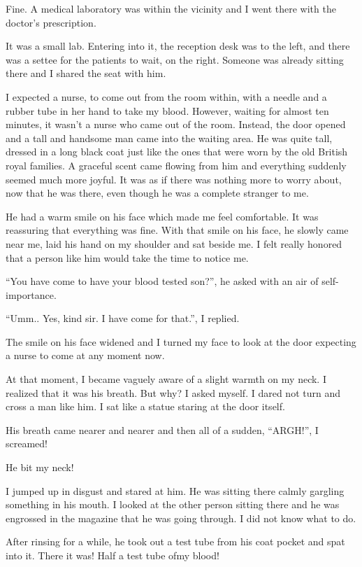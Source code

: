 \documentclass[twoside,11pt]{article}
\begin{document}
Fine. A medical laboratory was within the vicinity and I went there with the doctor's prescription.

It was a small lab. Entering into it, the reception desk was to the left, and there was a settee for the patients to wait, on the right. Someone was already sitting there and I shared the seat with him.

I expected a nurse, to come out from the room within, with a needle and a rubber tube in her hand to take my blood. However, waiting for almost ten minutes, it wasn't a nurse who came out of the room. Instead, the door opened and a tall and handsome man came into the waiting area. He was quite tall, dressed in a long black coat just like the ones that were worn by the old British royal families. A graceful scent came flowing from him and everything suddenly seemed much more joyful. It was as if there was nothing more to worry about, now that he was there, even though he was a complete stranger to me.

He had a warm smile on his face which made me feel comfortable. It was reassuring that everything was fine. With that smile on his face, he slowly came near me, laid his hand on my shoulder and sat beside me. I felt really honored that a person like him would take the time to notice me.

``You have come to have your blood tested son?'', he asked with an air of self-importance.

``Umm.. Yes, kind sir. I have come for that.'', I replied.

The smile on his face widened and I turned my face to look at the door expecting a nurse to come at any moment now.

At that moment, I became vaguely aware of a slight warmth on my neck. I realized that it was his breath. But why? I asked myself. I dared not turn and cross a man like him. I sat like a statue staring at the door itself.

His breath came nearer and nearer and then all of a sudden, ``ARGH!'', I screamed!

He bit my neck!

I jumped up in disgust and stared at him. He was sitting there calmly gargling something in his mouth. I looked at the other person sitting there and he was engrossed in the magazine that he was going through. I did not know what to do.

After rinsing for a while, he took out a test tube from his coat pocket and spat into it. There it was! Half a test tube ofmy blood!
\end{document}
